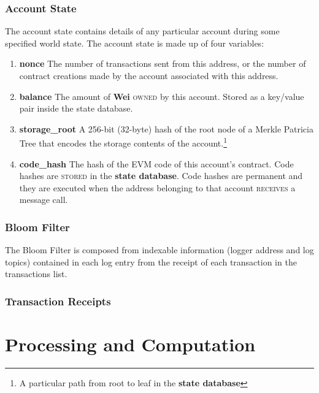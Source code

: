 \documentclass[10pt,letterpaper,leqno,bibliography=totoc]{scrartcl}
\newenvironment{alphafootnotes}
{\par\edef\savedfootnotenumber{\number\value{footnote}}
\renewcommand{\thefootnote}{\alph{footnote}}
\setcounter{footnote}{0}}
{\par\setcounter{footnote}{\savedfootnotenumber}}
\begin{document}
\begin{alphafootnotes}
\begin{multicols*}{2}
					\subsubsection{Account State}
				The account state contains details of any particular account during some specified world state. The account state is made up of four variables:
				\begin{enumerate}
					\item \textbf{nonce} The number of transactions sent from this address, or the number of contract creations made by the account associated with this address.
					\item \textbf{balance} The amount of \textbf{Wei} \textsc{owned} by this account. Stored as a key/value pair inside the state database. 
					\item \textbf{storage\_root} A 256-bit (32-byte) hash of the root node of a Merkle Patricia Tree that encodes the storage contents of the account.\footnote{A particular path from root to leaf in the \textbf{\gls{state database}}} 
					\item \textbf{code\_hash} The hash of the EVM code of this account's contract. Code hashes are \textsc{stored} in the \textbf{\gls{state database}}. Code hashes are permanent and they are executed when the address belonging to that account \textsc{receives} a message call.

				\end{enumerate}

    					\subsubsection{Bloom Filter}
				The Bloom Filter is composed from indexable information (logger address and log topics) contained in each log entry from the receipt of each transaction in the transactions list. 

					\subsubsection{Transaction Receipts}


		\section{Processing and Computation}
	

\end{multicols*}
\end{alphafootnotes}
\end{document}
